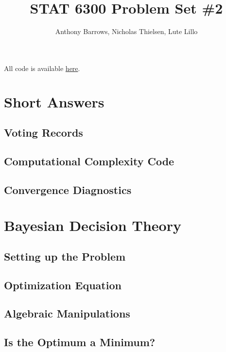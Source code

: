\documentclass[]{article}
\title{STAT 6300 Problem Set \#2}
\author{Anthony Barrows, Nicholas Thielsen, Lute Lillo}
\begin{document}
\maketitle

All code is available \href{https://github.com/ajbarrows/uvmbayes/blob/main/notebooks/problem_sets/20240927-problem_set_2.ipynb}{here}.

\section{Short Answers}

\subsection{Voting Records}


\subsection{Computational Complexity Code}


\subsection{Convergence Diagnostics}


\section{Bayesian Decision Theory}

\subsection{Setting up the Problem}


\subsection{Optimization Equation}


\subsection{Algebraic Manipulations}


\subsection{Is the Optimum a Minimum?}

\end{document}
